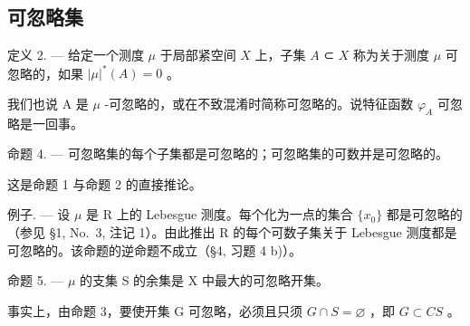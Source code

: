 \subsection{可忽略集}

定义 2. --- 给定一个测度 \(\mu\) 于局部紧空间 \(X\) 上，子集 \(A\) ⊂ \(X\) 称为关于测度 \(\mu\) 可忽略的，如果 \(|\mu|^*(A) = 0\) 。

我们也说 A 是 \(\mu\) -可忽略的，或在不致混淆时简称可忽略的。说特征函数 \(\varphi_{A}\) 可忽略是一回事。

命题 4. --- 可忽略集的每个子集都是可忽略的；可忽略集的可数并是可忽略的。

这是命题 1 与命题 2 的直接推论。

例子. --- 设 \(\mu\) 是 R 上的 Lebesgue 测度。每个化为一点的集合 \(\{x_{0}\}\) 都是可忽略的（参见 §1, No.~3, 注记 1）。由此推出 R 的每个可数子集关于 Lebesgue 测度都是可忽略的。该命题的逆命题不成立（§4, 习题 4 b)）。

命题 5. --- \(\mu\) 的支集 S 的余集是 X 中最大的可忽略开集。

事实上，由命题 3，要使开集 G 可忽略，必须且只须 \(G \cap S = \varnothing\) ，即 \(G \subset CS\) 。

